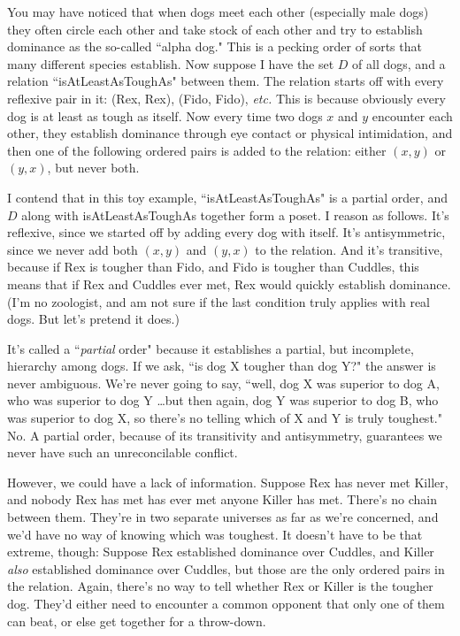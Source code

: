 You may have noticed that when dogs meet each other (especially male dogs)
they often circle each other and take stock of each other and try to
establish dominance as the so-called ``alpha dog." This is a pecking order
of sorts that many different species establish. Now suppose I have the set
$D$ of all dogs, and a relation ``isAtLeastAsToughAs" between them. The
relation starts off with every reflexive pair in it: (Rex, Rex), (Fido,
Fido), \textit{etc.} This is because obviously every dog is at least as
tough as itself. Now every time two dogs $x$ and $y$ encounter each other,
they establish dominance through eye contact or physical intimidation, and
then one of the following ordered pairs is added to the relation: either
$(x,y)$ or $(y,x)$, but never both.

I contend that in this toy example, ``isAtLeastAsToughAs" is a partial
order, and $D$ along with isAtLeastAsToughAs together form a poset.  I
reason as follows. It's reflexive, since we started off by adding every dog
with itself. It's antisymmetric, since we never add both $(x,y)$ and
$(y,x)$ to the relation. And it's transitive, because if Rex is tougher
than Fido, and Fido is tougher than Cuddles, this means that if Rex and
Cuddles ever met, Rex would quickly establish dominance. (I'm no zoologist,
and am not sure if the last condition truly applies with real dogs. But
let's pretend it does.)

It's called a ``\textit{partial} order" because it establishes a partial,
but incomplete, hierarchy among dogs. If we ask, ``is dog X tougher than
dog Y?" the answer is never ambiguous. We're never going to say, ``well, dog
X was superior to dog A, who was superior to dog Y \dots but then again,
dog Y was superior to dog B, who was superior to dog X, so there's no
telling which of X and Y is truly toughest." No. A partial order, because
of its transitivity and antisymmetry, guarantees we never have such an
unreconcilable conflict. 

However, we could have a lack of information. Suppose Rex has never met
Killer, and nobody Rex has met has ever met anyone Killer has met. There's
no chain between them. They're in two separate universes as far as we're
concerned, and we'd have no way of knowing which was toughest. It doesn't
have to be that extreme, though: Suppose Rex established dominance over
Cuddles, and Killer \textit{also} established dominance over Cuddles, but
those are the only ordered pairs in the relation. Again, there's no way to
tell whether Rex or Killer is the tougher dog. They'd either need to
encounter a common opponent that only one of them can beat, or else get
together for a throw-down.

